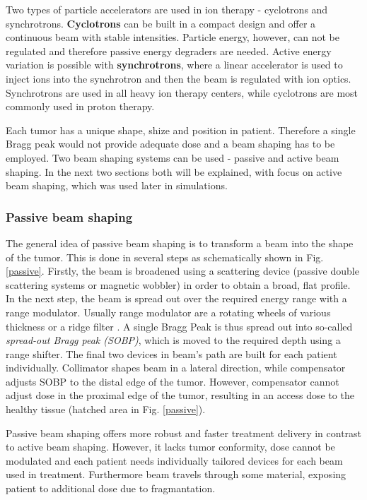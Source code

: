 \documentclass[type=dr, dr=rernat, accentcolor=tud7b,colorbacktitle, bigchapter, openright, twoside, 12pt ]{tudthesis}
\begin{document}
Two types of particle accelerators are used in ion therapy - cyclotrons and synchrotrons. \textbf{Cyclotrons} can be built in a compact design and offer a continuous beam with
stable intensities. Particle energy, however, can not be regulated and therefore passive energy degraders are needed. Active energy variation is possible with \textbf{synchrotrons}, where a linear
accelerator is used to inject ions into the synchrotron and then the beam is regulated with ion optics. Synchrotrons are used in all heavy ion therapy centers, while cyclotrons are most
commonly used in proton therapy.

Each tumor has a unique shape, shize and position in patient. Therefore a single Bragg peak would not provide adequate dose and a beam shaping has to be employed. Two beam shaping systems
can be used - passive and active beam shaping. In the next two sections both will be explained, with focus on active beam shaping, which was used later in simulations.


\subsubsection{Passive beam shaping}

The general idea of passive beam shaping is to transform a beam into the shape of the tumor. This is done in several steps as schematically shown in Fig. \ref{passive}. Firstly, the beam is broadened using a scattering device (passive double scattering systems or magnetic wobbler)
 in order to obtain a broad, flat profile. In the next step, the beam is spread out over the required energy range with a range modulator. Usually range modulator are a rotating wheels of various thickness or a ridge filter \cite{Chu1993}.
 A single Bragg Peak is thus spread out into so-called \textit{spread-out Bragg peak (SOBP)}, which is moved to the required depth using a range shifter. The final two devices in beam's path are built for each patient individually. Collimator
 shapes beam in a lateral direction, while compensator adjusts SOBP to the distal edge of the tumor. However, compensator cannot adjust dose in the proximal edge of the tumor, resulting in an access dose to the healthy tissue (hatched area in
 Fig. \ref{passive}).
 
 Passive beam shaping offers more robust and faster treatment delivery in contrast to active beam shaping. However, it lacks tumor conformity, dose cannot be modulated and each patient needs individually tailored devices for each beam used in treatment.
 Furthermore beam travels through some material, exposing patient to additional dose due to fragmantation.
\end{document}
